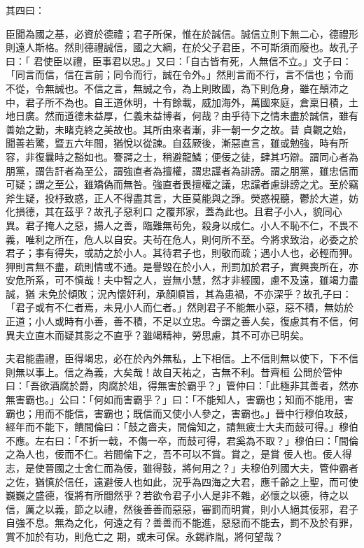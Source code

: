 \begin{pinyinscope}
 其四曰：



 臣聞為國之基，必資於德禮；君子所保，惟在於誠信。誠信立則下無二心，德禮形則遠人斯格。然則德禮誠信，國之大綱，在於父子君臣，不可斯須而廢也。故孔子曰：「
 君使臣以禮，臣事君以忠。」又曰：「自古皆有死，人無信不立。」文子曰：「同言而信，信在言前；同令而行，誠在令外。」然則言而不行，言不信也；令而不從，令無誠也。不信之言，無誠之令，為上則敗國，為下則危身，雖在顛沛之中，君子所不為也。自王道休明，十有餘載，威加海外，萬國來庭，倉稟日積，土地日廣。然而道德未益厚，仁義未益博者，何哉？由乎待下之情未盡於誠信，雖有善始之勤，未睹克終之美故也。其所由來者漸，非一朝一夕之故。昔
 貞觀之始，聞善若驚，暨五六年間，猶悅以從諫。自茲厥後，漸惡直言，雖或勉強，時有所容，非復曩時之豁如也。謇諤之士，稍避龍鱗；便佞之徒，肆其巧辯。謂同心者為朋黨，謂告訐者為至公，謂強直者為擅權，謂忠讜者為誹謗。謂之朋黨，雖忠信而可疑；謂之至公，雖矯偽而無咎。強直者畏擅權之議，忠讜者慮誹謗之尤。至於竊斧生疑，投杼致惑，正人不得盡其言，大臣莫能與之諍。熒惑視聽，鬱於大道，妨化損德，其在茲乎？故孔子惡利口
 之覆邦家，蓋為此也。且君子小人，貌同心異。君子掩人之惡，揚人之善，臨難無茍免，殺身以成仁。小人不恥不仁，不畏不義，唯利之所在，危人以自安。夫茍在危人，則何所不至。今將求致治，必委之於君子；事有得失，或訪之於小人。其待君子也，則敬而疏；遇小人也，必輕而狎。狎則言無不盡，疏則情或不通。是譽毀在於小人，刑罰加於君子，實興喪所在，亦安危所系，可不慎哉！夫中智之人，豈無小慧，然才非經國，慮不及遠，雖竭力盡誠，猶
 未免於傾敗；況內懷奸利，承顏順旨，其為患禍，不亦深乎？故孔子曰：「君子或有不仁者焉，未見小人而仁者。」然則君子不能無小惡，惡不積，無妨於正道；小人或時有小善，善不積，不足以立忠。今謂之善人矣，復慮其有不信，何異夫立直木而疑其影之不直乎？雖竭精神，勞思慮，其不可亦已明矣。



 夫君能盡禮，臣得竭忠，必在於內外無私，上下相信。上不信則無以使下，下不信則無以事上。信之為義，大矣哉！故自天祐之，吉無不利。昔齊桓
 公問於管仲曰：「吾欲酒腐於爵，肉腐於俎，得無害於霸乎？」管仲曰：「此極非其善者，然亦無害霸也。」公曰：「何如而害霸乎？」曰：「不能知人，害霸也；知而不能用，害霸也；用而不能信，害霸也；既信而又使小人參之，害霸也。」晉中行穆伯攻鼓，經年而不能下，饋間倫曰：「鼓之嗇夫，間倫知之，請無疲士大夫而鼓可得。」穆伯不應。左右曰：「不折一戟，不傷一卒，而鼓可得，君奚為不取？」穆伯曰：「間倫之為人也，佞而不仁。若間倫下之，吾不可以不賞。賞之，是賞
 佞人也。佞人得志，是使晉國之士舍仁而為佞，雖得鼓，將何用之？」夫穆伯列國大夫，管仲霸者之佐，猶慎於信任，遠避佞人也如此，況乎為四海之大君，應千齡之上聖，而可使巍巍之盛德，復將有所間然乎？若欲令君子小人是非不雜，必懷之以德，待之以信，厲之以義，節之以禮，然後善善而惡惡，審罰而明賞，則小人絕其佞邪，君子自強不息。無為之化，何遠之有？善善而不能進，惡惡而不能去，罰不及於有罪，賞不加於有功，則危亡之
 期，或未可保。永錫祚胤，將何望哉？




\end{pinyinscope}
